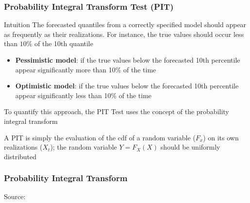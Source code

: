 \documentclass{beamer}
\newenvironment{wideitemize}{\itemize\addtolength{\itemsep}{10pt}}{\enditemize}
\begin{document}
\begin{frame}
  \frametitle{Probability Integral Transform Test (PIT)}

    \begin{exampleblock}{Intuition}
      The forecasted quantiles from a correctly specified model should appear as frequently as their realizations. For instance, the true values should occur less than $10\%$ of the 10th quantile
        \begin{itemize}
        \item \textbf{Pessimistic model}: if the true values below the forecasted 10th percentile appear significantly more than 10\% of the time
        \item \textbf{Optimistic model}: if the true values below the forecasted 10th percentile appear significantly less than 10\% of the time
        \end{itemize}      
    \end{exampleblock}
        
  \begin{wideitemize}
    \item To quantify this approach, the PIT Test uses the concept of the probability integral transform
    \item A PIT is simply the evaluation of the cdf of a random variable ($F_x$) on its own realizations ($X_t$); the random variable $Y = F_X(X)$ should be uniformly distributed
    \end{wideitemize}
    
\end{frame}

\begin{frame}
  \frametitle{Probability Integral Transform}
  \hspace*{15pt}\hbox{\scriptsize Source:}        
\end{frame}
\end{document}
